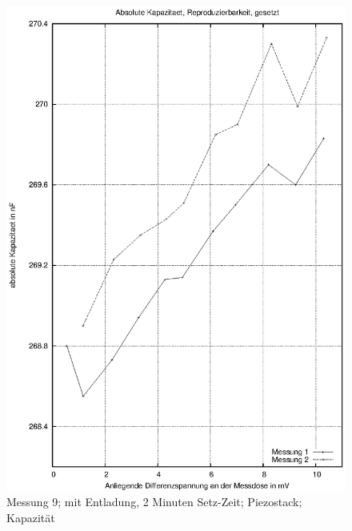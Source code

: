 \documentclass[11pt]{scrreprt} %
\begin{document}
\begin {figure}[htbp]
      \begin{center}
        \includegraphics{tabelle2_2_4}
      \end{center}
\caption{Messung 9; mit Entladung, 2 Minuten Setz-Zeit; Piezostack; Kapazität}
\label{fig:2.9}
\end{figure}
\setlongtables
\end{document}
